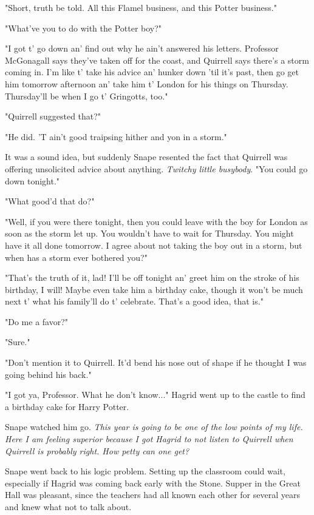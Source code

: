 \documentclass[a4paper,11pt]{article}
\begin{document}
"Short, truth be told. All this Flamel business, and this Potter business."

"What've you to do with the Potter boy?"

"I got t' go down an' find out why he ain't answered his letters. Professor McGonagall says they've taken off for the coast, and Quirrell says there's a storm coming in. I'm like t' take his advice an' hunker down 'til it's past, then go get him tomorrow afternoon an' take him t' London for his things on Thursday. Thursday'll be when I go t' Gringotts, too."

"Quirrell suggested that?"

"He did. 'T ain't good traipsing hither and yon in a storm."

It was a sound idea, but suddenly Snape resented the fact that Quirrell was offering unsolicited advice about anything. \emph{Twitchy little busybody}. "You could go down tonight."

"What good'd that do?"

"Well, if you were there tonight, then you could leave with the boy for London as soon as the storm let up. You wouldn't have to wait for Thursday. You might have it all done tomorrow. I agree about not taking the boy out in a storm, but when has a storm ever bothered you?"

"That's the truth of it, lad! I'll be off tonight an' greet him on the stroke of his birthday, I will! Maybe even take him a birthday cake, though it won't be much next t' what his family'll do t' celebrate. That's a good idea, that is."

"Do me a favor?"

"Sure."

"Don't mention it to Quirrell. It'd bend his nose out of shape if he thought I was going behind his back."

"I got ya, Professor. What he don't know..." Hagrid went up to the castle to find a birthday cake for Harry Potter.

Snape watched him go. \emph{This year is going to be one of the low points of my life. Here I am feeling superior because I got Hagrid to not listen to Quirrell when Quirrell is probably right. How petty can one get?}

Snape went back to his logic problem. Setting up the classroom could wait, especially if Hagrid was coming back early with the Stone. Supper in the Great Hall was pleasant, since the teachers had all known each other for several years and knew what not to talk about.
\end{document}

